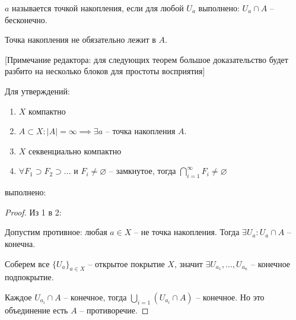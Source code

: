 \documentclass[main]{subfiles}
\begin{document}
\begin{definition}
    $a$ называется точкой накопления, если для любой $U_a$ выполнено: $U_a \cap A$ -- бесконечно.
\end{definition}
\begin{remark}
    Точка накопления не обязательно лежит в $A$.
\end{remark}

[Примечание редактора: для следующих теорем большое доказательство будет разбито на несколько блоков для простоты восприятия]
\begin{theorem}\label{axOfCount:compactRel}
    Для утверждений:
    \begin{enumerate}
        \item $X$ компактно
        \item $A \subset X: |A| = \infty \implies \exists a$ -- точка накопления $A$.
        \item $X$ секвенциально компактно
        \item $\forall F_1 \supset F_2 \supset ...$ и $F_i \neq \varnothing$ -- замкнутое, тогда $\bigcap_{i = 1}^\infty F_i \neq \varnothing$
    \end{enumerate}
    выполнено:
    \begin{center}
        
    \end{center}
\end{theorem}
\begin{proof}
    Из 1 в 2:

    Допустим противное: любая $a \in X$ -- не точка накопления.
    Тогда $\exists U_a: U_a \cap A$ -- конечна.

    Соберем все $\{U_a\}_{a \in X}$ -- открытое покрытие $X$,
    значит $\exists U_{a_1},..., U_{a_n}$ -- конечное подпокрытие.

    Каждое $U_{a_i} \cap A$ -- конечное, тогда $\bigcup_{i=1} (U_{a_i} \cap A)$ -- конечное.
    Но это объединение есть $A$ -- противоречие.
\end{proof}
\end{document}
